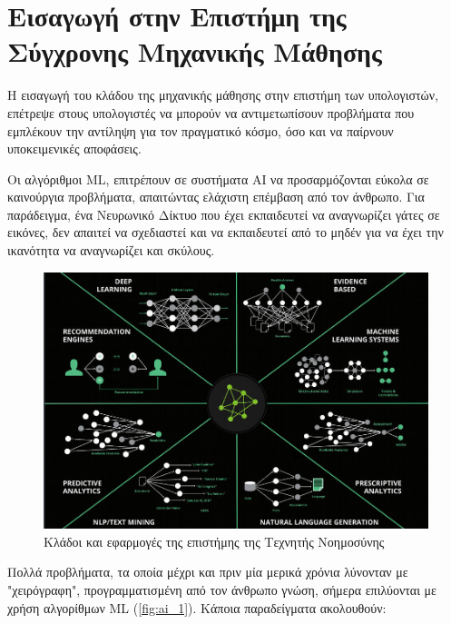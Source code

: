 \section{Εισαγωγή στην Επιστήμη της Σύγχρονης Μηχανικής Μάθησης}
\label{sec:theory_ml}

Η εισαγωγή του κλάδου της μηχανικής μάθησης στην επιστήμη των υπολογιστών,
επέτρεψε στους υπολογιστές να μπορούν να αντιμετωπίσουν προβλήματα που εμπλέκουν
την αντίληψη για τον πραγματικό κόσμο, όσο και να παίρνουν υποκειμενικές αποφάσεις.

Οι αλγόριθμοι ML, επιτρέπουν σε συστήματα AI
να προσαρμόζονται εύκολα σε καινούργια προβλήματα, απαιτώντας ελάχιστη επέμβαση από τον άνθρωπο.
Για παράδειγμα, ένα Νευρωνικό Δίκτυο που έχει εκπαιδευτεί να αναγνωρίζει γάτες σε εικόνες,
δεν απαιτεί να σχεδιαστεί και να εκπαιδευτεί από το μηδέν για να έχει την ικανότητα
να αναγνωρίζει και σκύλους.

\begin{figure}[!ht]
  \centering
  \includegraphics[width=1\textwidth]{./images/chapter3/AI_1.jpg}
  \caption[Κλάδοι και εφαρμογές της επιστήμης της Τεχνητής Νοημοσύνης]{Κλάδοι και εφαρμογές της επιστήμης της Τεχνητής Νοημοσύνης}
  \label{fig:ai_1}
\end{figure}

Πολλά προβλήματα, τα οποία μέχρι και πριν μία μερικά χρόνια λύνονταν με
"χειρόγραφη", προγραμματισμένη από τον άνθρωπο γνώση, σήμερα επιλύονται με χρήση
αλγορίθμων ML (\autoref{fig:ai_1}). Κάποια παραδείγματα ακολουθούν:

